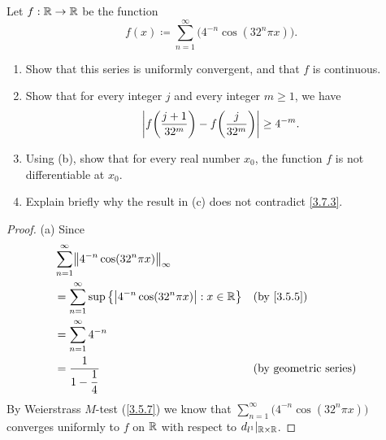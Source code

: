 \begin{ex}\label{ex:4.7.10}
  Let \(f : \mathbb{R} \to \mathbb{R}\) be the function
  \[
    f(x) \coloneqq \sum_{n = 1}^\infty \big(4^{-n} \cos(32^n \pi x)\big).
  \]
  \begin{enumerate}
    \item Show that this series is uniformly convergent, and that \(f\) is continuous.
    \item Show that for every integer \(j\) and every integer \(m \geq 1\), we have
          \[
            \left\lvert f\bigg(\dfrac{j + 1}{32^m}\bigg) - f\bigg(\dfrac{j}{32^m}\bigg)\right\rvert \geq 4^{-m}.
          \]
    \item Using (b), show that for every real number \(x_0\), the function \(f\) is not differentiable at \(x_0\).
    \item Explain briefly why the result in (c) does not contradict \cref{3.7.3}.
  \end{enumerate}
\end{ex}

\begin{proof}{(a)}
  Since
  \begin{align*}
     & \sum_{n = 1}^\infty \norm*{4^{-n} \cos(32^n \pi x)}_{\infty}                                                     \\
     & = \sum_{n = 1}^\infty \sup\big\{\abs{4^{-n} \cos(32^n \pi x)} : x \in \R\big\} &  & \text{(by \cref{3.5.5})}     \\
     & = \sum_{n = 1}^\infty 4^{-n}                                                                                     \\
     & = \dfrac{1}{1 - \dfrac{1}{4}}                                                  &  & \text{(by geometric series)}
  \end{align*}
  By Weierstrass \(M\)-test (\cref{3.5.7}) we know that \(\sum_{n = 1}^\infty \big(4^{-n} \cos(32^n \pi x)\big)\) converges uniformly to \(f\) on \(\mathbb{R}\) with respect to \(d_{l^1}|_{\mathbb{R} \times \mathbb{R}}\).
\end{proof}

